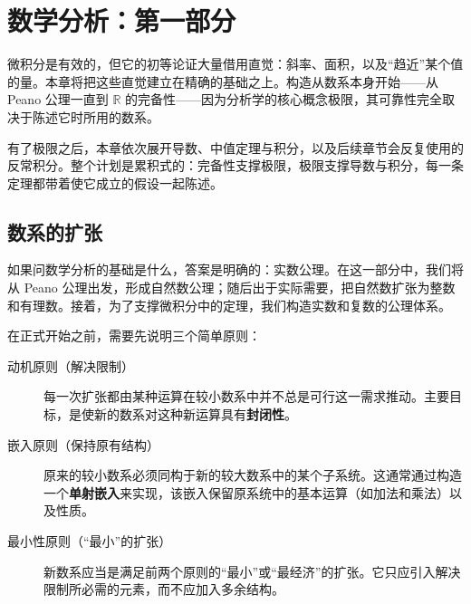 \chapter{数学分析：第一部分}

微积分是有效的，但它的初等论证大量借用直觉：斜率、面积，以及“趋近”某个值的量。本章将把这些直觉建立在精确的基础之上。构造从数系本身开始——从 Peano 公理一直到 $\mathbb{R}$ 的完备性——因为分析学的核心概念极限，其可靠性完全取决于陈述它时所用的数系。

有了极限之后，本章依次展开导数、中值定理与积分，以及后续章节会反复使用的反常积分。整个计划是累积式的：完备性支撑极限，极限支撑导数与积分，每一条定理都带着使它成立的假设一起陈述。

\section{数系的扩张}
如果问数学分析的基础是什么，答案是明确的：实数公理。在这一部分中，我们将从 Peano 公理出发，形成自然数公理；随后出于实际需要，把自然数扩张为整数和有理数。接着，为了支撑微积分中的定理，我们构造实数和复数的公理体系。

在正式开始之前，需要先说明三个简单原则：
\begin{description}
    \item[动机原则（解决限制）] 每一次扩张都由某种运算在较小数系中并不总是可行这一需求推动。主要目标，是使新的数系对这种新运算具有\textbf{封闭性}。
    \item[嵌入原则（保持原有结构）] 原来的较小数系必须同构于新的较大数系中的某个子系统。这通常通过构造一个\textbf{单射嵌入}来实现，该嵌入保留原系统中的基本运算（如加法和乘法）以及性质。
    \item[最小性原则（“最小”的扩张）] 新数系应当是满足前两个原则的“最小”或“最经济”的扩张。它只应引入解决限制所必需的元素，而不应加入多余结构。
\end{description}


